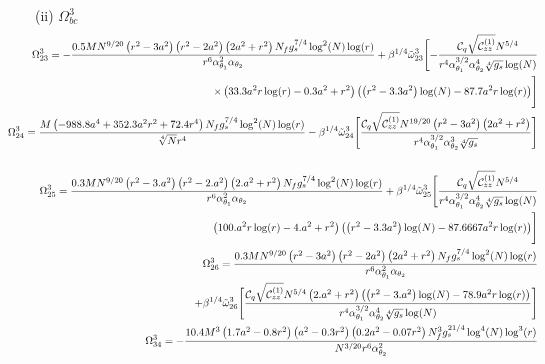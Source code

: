 \documentclass[a4paper,11pt,fleqn]{article}
\theoremstyle{plain}
\theoremstyle{definition}
\begin{document}
\noindent (ii) $\Omega^3_{bc}$
{\footnotesize
\begin{eqnarray}   
\label{Omega3bc}
   & & \hskip -0.5in \Omega^3_{23}=-\frac{0.5 M N^{9/20} \left(r^2-3 a^2\right) \left(r^2-2 a^2\right) \left(2 a^2+r^2\right) N_f g_s^{7/4} \log ^2(N) \log (r)}{r^6 \alpha _{\theta_1}^2 \alpha _{\theta_2}}+\beta^{1/4}\tilde{\omega}^3_{23}\Biggl[-\frac{ {\cal C}_q \sqrt{{\cal C}_{zz}^{(1)}} N^{5/4}}{r^4 \alpha _{\theta_1}^{3/2} \alpha _{\theta_2}^4 \sqrt[4]{g_s} \log (N)}\nonumber\\
   & & \hskip -0.5in \times \left(33.3 a^2 r \log (r)-0.3 a^2+r^2\right) \left(\left(r^2-3.3 a^2\right) \log (N)-87.7 a^2 r \log(r)\right)\Biggr] \nonumber\\
   & & \hskip -0.5in \Omega^3_{24}=\frac{M \left(-988.8 a^4+352.3 a^2 r^2+72.4 r^4\right) N_f g_s^{7/4} \log ^2(N) \log (r)}{\sqrt[4]{N} r^4}-\beta^{1/4}\tilde{\omega}^3_{24}\Biggl[\frac{{\cal C}_q \sqrt{{\cal C}_{zz}^{(1)}} N^{19/20} \left(r^2-3 a^2\right) \left(2 a^2+r^2\right)}{r^4 \alpha _{\theta_1}^{3/2} \alpha _{\theta_2}^3 \sqrt[4]{g_s}}\Biggr] \nonumber\\
   & & \nonumber\\
& & \hskip -.5in \Omega^3_{25}=\frac{0.3 M N^{9/20} \left(r^2-3. a^2\right) \left(r^2-2. a^2\right) \left(2. a^2+r^2\right) N_f g_s^{7/4} \log ^2(N) \log (r)}{r^6 \alpha _{\theta_1}^2 \alpha _{\theta_2}}+\beta^{1/4}\tilde{\omega}^3_{25}\Biggl[\frac{ {\cal C}_q \sqrt{{\cal C}_{zz}^{(1)}} N^{5/4} }{r^4 \alpha
   _{\theta_1}^{3/2} \alpha _{\theta_2}^4 \sqrt[4]{g_s} \log (N)} \nonumber\\
   & & \hskip-0.5in \left(100. a^2 r \log (r)-4. a^2+r^2\right) \left(\left(r^2-3.3 a^2\right) \log (N)-87.6667 a^2 r \log (r)\right)\Biggr]\nonumber\\
   & & \hskip -0.5in \Omega^3_{26}=\frac{0.3 M N^{9/20} \left(r^2-3 a^2\right) \left(r^2-2 a^2\right) \left(2 a^2+r^2\right) N_f g_s^{7/4} \log ^2(N) \log (r)}{r^6 \alpha _{\theta_1}^2 \alpha _{\theta_2}} \nonumber\\
   & & \hskip -0.5in+ \beta^{1/4}\tilde{\omega}^3_{26}\Biggl[\frac{ {\cal C}_q \sqrt{{\cal C}_{zz}^{(1)}} N^{5/4} \left(2. a^2+r^2\right) \left(\left(r^2-3. a^2\right) \log (N)-78.9 a^2 r \log (r)\right)}{r^4 \alpha _{\theta_1}^{3/2} \alpha _{\theta
   _2}^4 \sqrt[4]{g_s} \log (N)}\Biggr]
   \nonumber\\
   & & \hskip -0.5in \Omega^3_{34}=-\frac{10.4 M^3 \left(1.7 a^2-0.8 r^2\right) \left(a^2-0.3 r^2\right) \left(0.2 a^2-0.07 r^2\right) N_f^3 g_s^{21/4} \log ^4(N) \log ^3(r)}{N^{3/20} r^6 \alpha _{\theta_2}^2} \nonumber\\

\end{eqnarray}}
\end{document}

